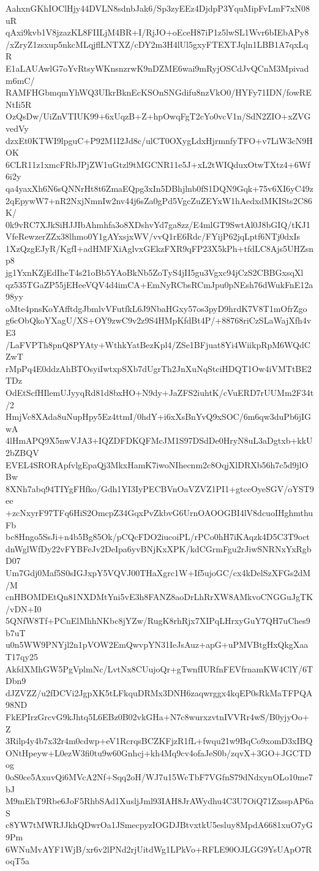 AahxnGKhIOClHjy44DVLN8sdnbJak6/Sp3zyEEz4DjdpP3YquMipFvLmF7xN08uR
qAxi9kvb1V8jzazKL8FIILjM4BR+I/RjJO+oEceH87iP1z5lwSL1Wvr6bIEbAPy8
/xZryZ1zsxup5nkcMLqjflLNTXZ/cDY2m3H4lUl5gxyFTEXTJqln1LBB1A7qxLqR
E1aLAUAwlG7oYvRtsyWKnsnzrwK9nDZME6wai9mRyjOSCdJvQCnM3Mpivadm6mC/
RAMFHGbmqmYhWQ3UIkrBknEcKSOnSNGdifu8nzVkO0/HYFy71IDN/fowRENtIi5R
OzQsDw/UiZnVTIUK99+6xUqzB+Z+hpOwqFgT2cYo0vcV1n/SdN2ZIO+xZVGvedVy
dzxEt0KTWI9lpguC+P92M1I2Jd8c/ulCT0OXygLdxHjrmnfyTFO+v7LiW3cN9HOK
6CLR11z1xmcFRbJPjZW1uGtzl9tMGCNR11e5J+xL2tWIQduxOtwTXtz4+6Wf6i2y
qa4yaxXh6N6sQNNrHt8t6ZmaEQpg3xIn5DBhjlnb0fS1DQN9Gqk+75v6XI6yC49z
2qEpywW7+nR2NxjNmnIw2nv44j6sZa0gPd5VgcZuZEYxW1hAedxdMKISts2C86K/
0k9vRC7XJkSiHJJIbAhmhfa3o8XDshvYd7ga8zz/E4mlGT9SwtAl0J8bGIQ/tKJ1
VfeRewzerZZx38lhmo0Y1gAYxsjxWV/vvQ1rE6Rdc/FYijP62jqLptf6NTj0dxIs
1XzQzgEJyR/KgfI+adHMFXiAglvxGEkzFXR9qFP23X5kPh+tfdLC8Ajs5UHZsnp8
jg1YxnKZjEdIheT4s21oBb5YAoBkNb5ZoTyS4jII5gu3Vgxc94jCzS2CBBGxsqXl
qz535TGaZP55jEHeeVQV4d4imCA+EmNyRCbsRCmJpu0pNEsh76dWukFnE12a98yy
oMte4pnsKoYAfftdgJbmlvVFutfkL6J9NbaHGxy57os3pyD9hrdK7V8T1mOfrZgo
g6cObQkoYXagU/XS+OY9zwC9v2z9S4HMpKfdBt4P/+88768riCzSLaWajXfh4vE3
/LaFVPTh8pnQ8PYAty+WthkYatBezKpl4/ZSe1BFjuat8Yi4WiikpRpM6WQdCZwT
rMpPq4E0ddzAhBTOsyiIwtxpSXb7dUgrTh2JnXuNqStciHDQT1Ow4iVMTtBE2TDz
OdEtScfHIlemUJyyqRd81d8bxHO+N9dy+JaZFS2iuhtK/cVuERD7rUUMm2F34t/2
HmjVc8XAda8uNupHpy5Ez4ttmI/0hdY+i6xXsBnYvQ9xSOC/6m6qw3duPb6jIGwA
4lHmAPQ9X5nwVJA3+IQZDFDKQFMcJM1S97DSdDe0HryN8uL3aDgtxb+kkU2bZBQV
EVEL4SRORApfvlgEpaQj3MkxHamK7iwoNIhecnm2c8OqjXlDRXb56h7c5d9jlOBw
8XNh7abq94TIYgFHfko/Gdh1YI3IyPECBVnOaVZVZ1PI1+gtceOyeSGV/oYST9ee
+zcNxyrF97TFq6HiS2OmcpZ34GqxPvZkbvG6UrnOAOOGBI4lV8dcuoIHghmthuFb
bc8Hngo5SsJi+n4b5Bg85Ok/pCQcFDO2iucoiPL/rPCo0hH7iKAqzk4D5C3T9oct
dnWglWfDy22vFYBFeJv2DeIpa6yvBNjKxXPK/kdCGrmFgu2rJiwSNRNxYxRgbD07
Um7Gdj0Maf5S0sIGJxpY5VQVJ00THaXgrc1W+If5ujoGC/cx4kDelSzXFGs2dM/M
cnHBOMDEtQn81NXDMtYni5vE3h8FANZ8aoDrLhRrXW8AMkvoCNGGuJgTK/vDN+I0
5QNfW8Tf+PCnElMhhNKbc8jYZw/RugK8rhRjx7XIPqLHrxyGuY7QH7uChes9b7uT
u0n5WW9PNYjl2n1pVOW2EmQwvpYN31IeJsAuz+apG+uPMVBtgHxQkgXaaT17qy25
AkfdXMhGW5PgVplmNc/LvtNx8CUujoQr+gTwnfIURfnFEVfrnamKW4ClY/6TDbn9
dJZVZZ/u2fDCVi2JgpXK5tLFkquDRMx3DNH6zaqwrggx4kqEP0sRkMaTFPQA98ND
FkEPIrzGrcvG9kJhtq5L6EBz0B02vkGHa+N7c8wurxzvtnIVVRr4wS/B0yjyOo+Z
3Rilp4y4b7x32r4m0cdwp+eV1RcrqsBCZKFjzR1fL+fwqu21w9BqCo9xomD3xIBQ
ONtHpeyw+L0ezW3fi0tu9w60Gnhcj+kh4Mq9cv4ofaJeS0b/zqvX+3GO+JGCTDog
0oS0ce5AxuvQi6MVcA2Nf+Sqq2oH/WJ7u15WcTbF7VGfnS79dNdxynOLo10me7bJ
M9mEhT9Rbe6JoF5RhbSAd1XusljJml93IAH8JrAWydhu4C3U7OiQ71ZxsspAP6aS
c8YW7tMWRJJkhQDwrOa1JSmecpyzIOGDJBtvxtkU5esluy8MpdA6681xuO7yG9Pm
6WNuMvAYF1WjB/xr6v2lPNd2rjUitdWg1LPkVo+RFLE90OJLGG9YsUApO7RoqT5a
